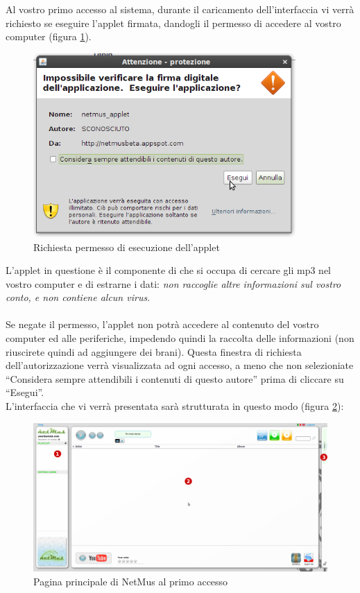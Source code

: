 Al vostro primo accesso al sistema, durante il caricamento dell'interfaccia vi
verr\`a richiesto se eseguire l'applet firmata, dandogli il permesso di accedere
al vostro computer (figura \ref{fig:permessiApplet}).
\begin{figure}[!htbp]
  \centering
  \includegraphics[width=10cm]{img/MU/permessi_applet.png}
\caption{Richiesta permesso di esecuzione dell'applet}
\label{fig:permessiApplet}
\end{figure}
L'applet in questione \`e il componente di  che si occupa di cercare
gli mp3 nel vostro computer e di estrarne i dati: \emph{non raccoglie altre
informazioni sul vostro conto, e non contiene alcun virus}.\\
\\
Se negate il permesso, l'applet non potr\`a accedere al contenuto del vostro
computer ed alle periferiche, impedendo quindi la raccolta delle informazioni
(non riuscirete quindi ad aggiungere dei brani).
Questa finestra di richiesta dell'autorizzazione verr\`a visualizzata ad ogni
accesso, a meno che non selezioniate ``Considera sempre attendibili i contenuti
di questo autore'' prima di cliccare su ``Esegui''.\\

\newpage
L'interfaccia che vi verr\`a presentata sar\`a strutturata
in questo modo (figura \ref{fig:paginaPrincipale}):\\

\begin{figure}[!htbp]
  \centering
  \includegraphics[width=14cm]{img/MU/profile_blank.png}
\caption{Pagina principale di NetMus al primo accesso}
\label{fig:paginaPrincipale}
\end{figure}

